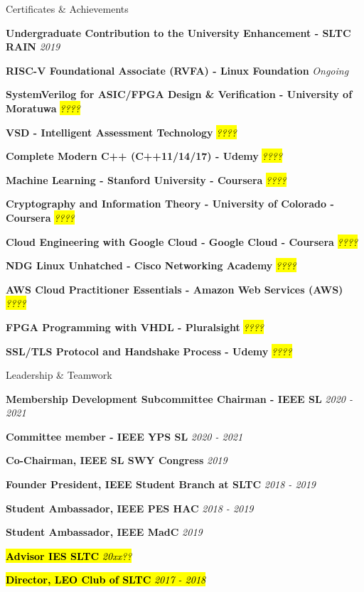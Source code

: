 \documentclass[
	11pt, %
]{./assets/resume} %
\begin{document}
\begin{rSection}{Certificates \& Achievements}

	\textbf{Undergraduate Contribution to the University Enhancement - SLTC RAIN} \hfill \textit{2019}

	\textbf{RISC-V Foundational Associate (RVFA) - Linux Foundation} \hfill \textit{Ongoing}

	\textbf{SystemVerilog for ASIC/FPGA Design \& Verification - University of Moratuwa} \hfill \hl{\textit{????}}

	\textbf{VSD - Intelligent Assessment Technology} \hfill \hl{\textit{????}}
	
	\textbf{Complete Modern C++ (C++11/14/17) - Udemy} \hfill \hl{\textit{????}}

	\textbf{Machine Learning - Stanford University - Coursera} \hfill \hl{\textit{????}}

	\textbf{Cryptography and Information Theory - University of Colorado - Coursera} \hfill \hl{\textit{????}}

	\textbf{Cloud Engineering with Google Cloud - Google Cloud - Coursera} \hfill \hl{\textit{????}}

	\textbf{NDG Linux Unhatched - Cisco Networking Academy} \hfill \hl{\textit{????}}

	\textbf{AWS Cloud Practitioner Essentials - Amazon Web Services (AWS)} \hfill \hl{\textit{????}}

	\textbf{FPGA Programming with VHDL - Pluralsight} \hfill \hl{\textit{????}}
	
	\textbf{SSL/TLS Protocol and Handshake Process - Udemy} \hfill \hl{\textit{????}}

\end{rSection}


\begin{rSection}{Leadership \& Teamwork}

	\textbf{Membership Development Subcommittee Chairman - IEEE SL} \hfill \textit{2020 - 2021}

	\textbf{Committee member - IEEE YPS SL} \hfill \textit{2020 - 2021}
	
	\textbf{Co-Chairman, IEEE SL SWY Congress} \hfill \textit{2019}

	\textbf{Founder President, IEEE Student Branch at SLTC} \hfill \textit{2018 - 2019}

	\textbf{Student Ambassador, IEEE PES HAC} \hfill \textit{2018 - 2019}

	\textbf{Student Ambassador, IEEE MadC} \hfill \textit{2019}

	\hl{\textbf{Advisor IES SLTC} \hfill \textit{20xx??}}

	\hl{\textbf{Director, LEO Club of SLTC} \hfill \textit{2017 - 2018}}

\end{rSection}
\end{document}
